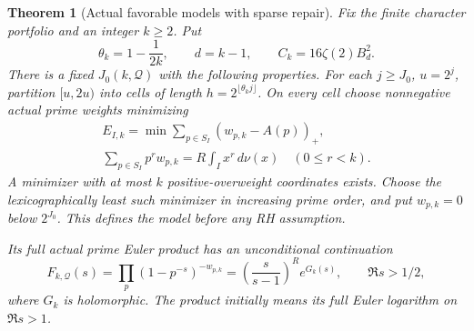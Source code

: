 \documentclass[11pt]{article}
\newtheorem{theorem}{Theorem}[section]
\theoremstyle{definition}
\begin{document}
\begin{theorem}[Actual favorable models with sparse repair]
\label{thm:all-moment-actual-prime-models}
Fix the finite character portfolio and an integer $k\ge2$.
Put
\[
 \theta_k=1-\frac1{2k},\qquad d=k-1,\qquad
 C_k=16\zeta(2)B_d^2.
\]
There is a fixed $J_0(k,\mathcal Q)$ with the following
properties. For each $j\ge J_0$, $u=2^j$, partition $[u,2u)$
into cells of length $h=2^{\lfloor\theta_kj\rfloor}$.
On every cell choose nonnegative actual prime weights
minimizing
\begin{equation}
 \begin{gathered}
 E_{I,k}=\min\sum_{p\in S_I}(w_{p,k}-A(p))_+,\\
 \sum_{p\in S_I}p^r w_{p,k}
                 =R\int_I x^r\,d\nu(x)\quad(0\le r<k).
 \end{gathered}
 \label{eq:higher-moment-prime-program}
\end{equation}
A minimizer with at most $k$ positive-overweight coordinates
exists. Choose the lexicographically least such minimizer
in increasing prime order, and put $w_{p,k}=0$ below
$2^{J_0}$. This defines the model before any RH assumption.

Its full actual prime Euler product has an unconditional
continuation
\begin{equation}
 F_{k,\mathcal Q}(s)=\prod_p(1-p^{-s})^{-w_{p,k}}
       =\left(\frac{s}{s-1}\right)^R e^{G_k(s)},
       \qquad \Re s>1/2,
 \label{eq:higher-moment-favorable-product}
\end{equation}
where $G_k$ is holomorphic. The product initially means its
full Euler logarithm on $\Re s>1$.


\end{theorem}
\end{document}
